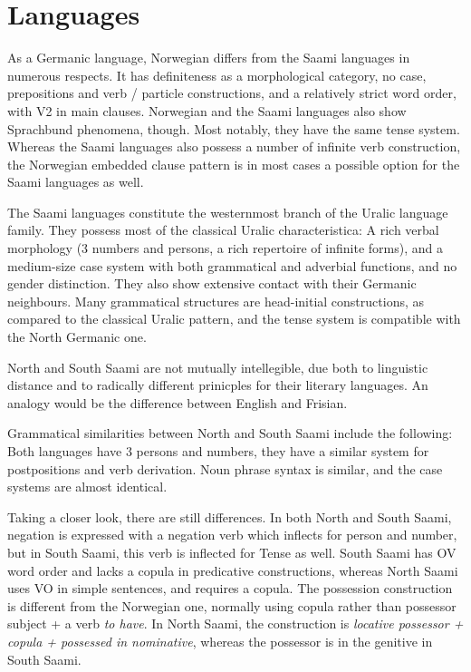 \documentclass[a4paper,11pt,twocolumn]{article}
\begin{document}
\section{Languages}

As a Germanic language, Norwegian differs from the Saami languages
in numerous respects. It has definiteness as a morphological category,
no case, prepositions and verb / particle constructions, and a 
relatively strict word order, with V2 in main clauses. Norwegian
and the Saami languages also show Sprachbund phenomena, though.
Most notably, they have the same tense system. Whereas the Saami
languages also possess a number of infinite verb construction, the
Norwegian embedded clause pattern is in most cases a possible option
for the Saami languages as well.

The Saami languages constitute the westernmost branch of the Uralic
language family. They possess most of the classical Uralic
characteristica: A rich verbal morphology (3 numbers and persons, a
rich repertoire of infinite forms), and a medium-size case system with
both grammatical and adverbial functions, and no gender
distinction. They also show extensive contact with their Germanic
neighbours. Many grammatical structures are head-initial
constructions, as compared to the classical Uralic pattern, and the
tense system is compatible with the North Germanic one.

North and South Saami are not mutually intellegible, due both to
linguistic distance and to radically different prinicples for their
literary languages. An analogy would be the difference between English
and Frisian.

Grammatical similarities between North and South Saami include the
following: Both languages have 3 persons and numbers, they have a
similar system for postpositions and verb derivation. Noun phrase
syntax is similar, and the case systems are almost identical.

Taking a closer look, there are still differences. In both North and
South Saami, negation is expressed with a negation verb which inflects
for person and number, but in South Saami, this verb is inflected for
Tense as well. South Saami has OV word order and lacks a copula in
predicative constructions, whereas North Saami uses VO in simple
sentences, and requires a copula.  The possession construction is
different from the Norwegian one, normally using copula rather than
possessor subject + a verb \textit{to have}. In North Saami, the
construction is 
\textit{locative possessor + copula + possessed in nominative}, 
whereas the possessor is in the genitive in South
Saami.
\end{document}
